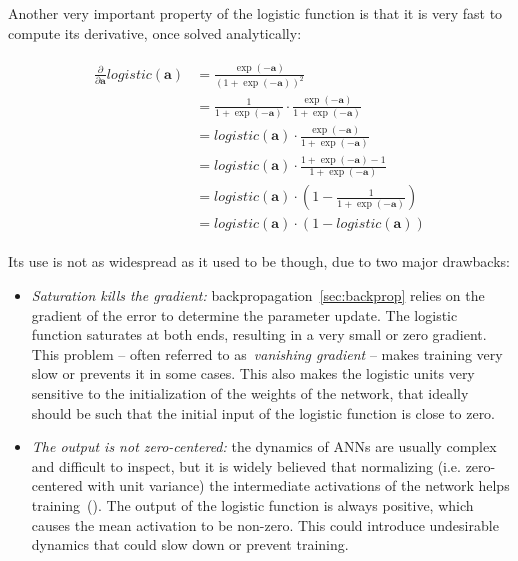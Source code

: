 Another very important property of the logistic function is that it is very
fast to compute its derivative, once solved analytically:

\begin{align}\label{eq:logistic_derivative}
\begin{split}%
    \frac{\partial}{\partial \mathbf{a}}logistic(\mathbf{a}) &=
        \frac{\exp(\mathbf{-a})}{\left(1+\exp(-\mathbf{a})\right)^2} \\
    &= \frac{1}{1+\exp(-\mathbf{a})} \cdot
        \frac{\exp(-\mathbf{a})}{1+\exp(-\mathbf{a})} \\
    &= logistic(\mathbf{a}) \cdot
        \frac{\exp(-\mathbf{a})}{1+\exp(-\mathbf{a})} \\
    &= logistic(\mathbf{a}) \cdot
        \frac{1+\exp(-\mathbf{a})-1}{1+\exp(-\mathbf{a})} \\
    &= logistic(\mathbf{a}) \cdot
        \left(1-\frac{1}{1+\exp(-\mathbf{a})}\right) \\
    &= logistic(\mathbf{a}) \cdot (1-logistic(\mathbf{a}))
\end{split}
\end{align}

Its use is not as widespread as it used to be though, due to two major
drawbacks:
\begin{itemize}
    \item \emph{Saturation kills the gradient:}
        backpropagation~\autoref{sec:backprop} relies on the gradient of the
        error to determine the parameter update. The logistic function
        saturates at both ends, resulting in a very small or zero gradient.
        This problem -- often referred to as~\emph{vanishing gradient} -- makes
        training very slow or prevents it in some cases. This also makes the
        logistic units very sensitive to the initialization of the weights of
        the network, that ideally should be such that the initial input of the
        logistic function is close to zero.
    \item \emph{The output is not zero-centered:} the dynamics of ANNs are
        usually complex and difficult to inspect, but it is widely believed
        that normalizing (i.e. zero-centered with unit variance) the
        intermediate activations of the network helps
        training~(\cite{Ioffe+Szegedy-2015,Laurent2015,arpit2016normalization,
        cooijmans2016recurrent}). The output of the logistic function is always
        positive, which causes the mean activation to be non-zero. This could
        introduce undesirable dynamics that could slow down or prevent
        training.
\end{itemize}


